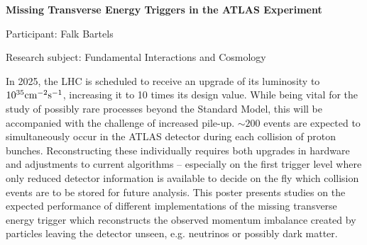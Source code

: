 \begin{minipage}[t]{1.0\textwidth}

\begin{center}

{{\large\bfseries Missing Transverse Energy Triggers in the ATLAS Experiment}\par}

\end{center}

{\noindent Participant: Falk Bartels\par} 

{\noindent Research subject: Fundamental Interactions and Cosmology\par}\medskip

\noindent In 2025, the LHC is scheduled to receive an upgrade of its luminosity to $10^{35} \textnormal{cm}^{-2}\textnormal{s}^{-1}$, increasing it to 10 times its design value. While being vital for the study of possibly rare processes beyond the Standard Model, this will be accompanied with the challenge of increased pile-up. $\sim 200$ events are expected to simultaneously occur in the ATLAS detector during each collision of proton bunches. Reconstructing these individually requires both upgrades in hardware and adjustments to current algorithms -- especially on the first trigger level where only reduced detector information is available to decide on the fly which collision events are to be stored for future analysis. This poster presents studies on the expected performance of different implementations of the missing transverse energy trigger which reconstructs the observed momentum imbalance created by particles leaving the detector unseen, e.g. neutrinos or possibly dark matter.\par\end{minipage}

\hfill 


